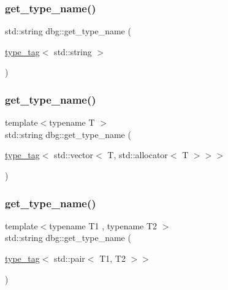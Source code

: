 \mbox{\label{namespacedbg_a3bcf58cf4aba1da7a34e79b0fb2ce036}} 
\subsubsection{\texorpdfstring{get\+\_\+type\+\_\+name()}{get\_type\_name()}\hspace{0.1cm}{\footnotesize\ttfamily [6/10]}}
{\footnotesize\ttfamily std\+::string dbg\+::get\+\_\+type\+\_\+name (\begin{DoxyParamCaption}\item[{\hyperlink{structdbg_1_1type__tag}{type\+\_\+tag}$<$ std\+::string $>$}]{ }\end{DoxyParamCaption})\hspace{0.3cm}{\ttfamily [inline]}}

\mbox{\label{namespacedbg_a09680fe23089b62fd2879bd1f38897a6}} 
\subsubsection{\texorpdfstring{get\+\_\+type\+\_\+name()}{get\_type\_name()}\hspace{0.1cm}{\footnotesize\ttfamily [7/10]}}
{\footnotesize\ttfamily template$<$typename T $>$ \\
std\+::string dbg\+::get\+\_\+type\+\_\+name (\begin{DoxyParamCaption}\item[{\hyperlink{structdbg_1_1type__tag}{type\+\_\+tag}$<$ std\+::vector$<$ T, std\+::allocator$<$ T $>$$>$$>$}]{ }\end{DoxyParamCaption})}

\mbox{\label{namespacedbg_aa4daf4ad755b0a3b4206debc162f064d}} 
\subsubsection{\texorpdfstring{get\+\_\+type\+\_\+name()}{get\_type\_name()}\hspace{0.1cm}{\footnotesize\ttfamily [8/10]}}
{\footnotesize\ttfamily template$<$typename T1 , typename T2 $>$ \\
std\+::string dbg\+::get\+\_\+type\+\_\+name (\begin{DoxyParamCaption}\item[{\hyperlink{structdbg_1_1type__tag}{type\+\_\+tag}$<$ std\+::pair$<$ T1, T2 $>$$>$}]{ }\end{DoxyParamCaption})}

